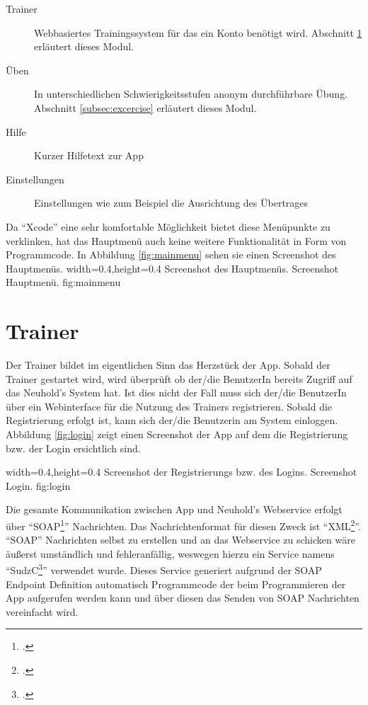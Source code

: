 \begin{description}
	\item[Trainer] Webbasiertes Trainingssystem für das ein Konto benötigt wird. Abschnitt \ref{subsec:trainer} erläutert dieses Modul. 
	\item[Üben] In unterschiedlichen Schwierigkeitsstufen anonym durchführbare Übung. Abschnitt \ref{subsec:excercise} erläutert dieses Modul.
	\item[Hilfe] Kurzer Hilfetext zur App
	\item[Einstellungen] Einstellungen wie zum Beispiel die Ausrichtung des Übertrages	
\end{description}

Da \enquote{Xcode} eine sehr komfortable Möglichkeit bietet diese Menüpunkte
zu verklinken, hat das Hauptmenü auch keine weitere Funktionalität in Form von Programmcode. 
In Abbildung \ref{fig:mainmenu} sehen sie einen Screenshot des Hauptmenüs. 
  {width=0.4\textwidth,height=0.4\textheight}%
  {Screenshot des Hauptmenüs.}%
  {Screenshot Hauptmenü.}%
  {fig:mainmenu}%

\section{Trainer}
\label{subsec:trainer}
Der Trainer bildet im eigentlichen Sinn das Herzstück der App. Sobald der Trainer gestartet wird, 
wird überprüft ob der/die BenutzerIn bereits Zugriff auf das Neuhold's System hat. Ist dies nicht der Fall
muss sich der/die BenutzerIn über ein Webinterface für die Nutzung des Trainers registrieren. Sobald
die Registrierung erfolgt ist, kann sich der/die Benutzerin am System einloggen. Abbildung \ref{fig:login}
zeigt einen Screenshot der App auf dem die Registrierung bzw. der Login ersichtlich sind.

  {width=0.4\textwidth,height=0.4\textheight}%
  {Screenshot der Registrierungs bzw. des Logins.}%
  {Screenshot Login.}%
  {fig:login}%
  
Die gesamte Kommunikation zwischen App und Neuhold's Webservice erfolgt über \enquote{SOAP\footcite{http://www.w3.org/TR/soap9/}} Nachrichten.
Das Nachrichtenformat für diesen Zweck ist \enquote{XML\footcite{http://www.w3.org/XML/}}. \enquote{SOAP} Nachrichten
selbst zu erstellen und an das Webservice zu schicken wäre äußerst umständlich und fehleranfällig, weswegen
hierzu ein Service namens \enquote{SudzC\footcite{http://sudzc.com}} verwendet wurde. 
Dieses Service generiert aufgrund der SOAP Endpoint Definition automatisch Programmcode der beim 
Programmieren der App aufgerufen werden kann und über diesen das Senden von SOAP Nachrichten 
vereinfacht wird.

